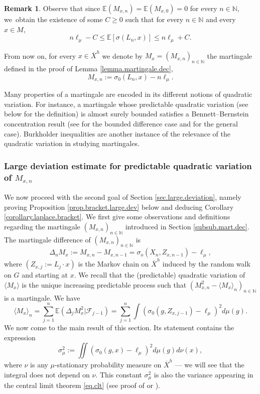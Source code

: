 \documentclass[JEP,XML,SOM,Unicode,published]{cedram}
\theoremstyle{plain}
\theoremstyle{definition}
\newtheorem{remark}[theorem]{Remark}
\newcommand\E{\mathbb{E}}
\newcommand\N{\mathbb{N}}
\begin{document}
\begin{remark}\label{remark.martingale}
Observe that since $\E(M_{x,n})=\E(M_{x,0})=0$ for every $n\in \N$, we~obtain the existence of some $C\geq 0$ such that for every $n\in \N$ and every $x\in M$,
\[
n\ell_\mu - C \leq \E[\sigma(L_n, x)] \leq n \ell_\mu+C.
\]
\end{remark}

From now on, for every $x\in \overline{X}^h$ we denote by $M_x=(M_{x,n})_{n\in \N}$ the martingale defined in the proof of Lemma \ref{lemma.martingale.dec}, \ie
\[
M_{x,n}:=\sigma_0(L_n, x)-n\ell_{\mu}.
\]

Many properties of a martingale are encoded in its different notions of quadratic variation. For instance, a martingale whose predictable quadratic variation (see below for the definition) is almost surely bounded satisfies a Bennett--Bernstein concentration result (see \cite{Freedman} for the bounded difference case and \cite{pena,DZ,fan.grama.liu} for the general case). Burkholder inequalities \cite{burkholder} are another instance of the relevance of the quadratic variation in studying martingales.

\subsubsection{Large deviation estimate for predictable quadratic variation of $M_{x,n}$} \label{subsub.bracket.large.dev}
We now proceed with the second goal of Section \ref{sec.large.deviation}, namely proving Proposition \ref{prop.bracket.large.dev} below and deducing Corollary \ref{corollary.laplace.bracket}. We first give some observations and definitions regarding the martingale $(M_{x,n})_{n\in \N}$ introduced in Section \ref{subsub.mart.dec}. The martingale difference of $(M_{x,n})_{n\in \N}$ is
\begin{equation}\label{our.martingale.difference}\Delta_n M_x:=M_{x,n}-M_{x,n-1}=\sigma_o(X_n, Z_{x,n-1})-\ell_\mu,\end{equation}
where $(Z_{x,j}:=L_j\cdot x)$ is the Markov chain on $\overline{X}^h$ induced by the random walk on $G$ and starting at $x$.
We recall that the (predictable) quadratic variation of $\langle M_x\rangle$ is the unique increasing predictable process such that $(M_{x,n}^2-\langle M_x \rangle_n)_{n\in \N}$ is a martingale. We have
\begin{equation}\label{bracket.expression}\langle M_x\rangle_n=
\sum_{j=1}^n{\E(\Delta_j M_{x}^2 | \mathcal{F}_{j-1})}=
\sum_{j=1}^n{\int{(\sigma_0(g,Z_{x,j-1}) -\ell_{\mu})^2 d\mu(g)}}.\end{equation}
We now come to the main result of this section. Its statement contains the expression
\begin{equation}\label{eq.exp.variance}
\sigma_{\mu}^2:=\iint{(\sigma_0(g,x)-\ell_{\mu})^2 d\mu(g) d\nu(x)},
\end{equation}
where $\nu$ is any $\mu$-stationary probability measure on $\overline{X}^h$ --- we will see that the integral does not depend on $\nu$. This constant $\sigma_\mu^2$ is also the variance appearing in the central limit theorem \eqref{eq.clt} (see proof of \cite[Th.\,4.7.b]{BQ.hyperbolic} or \cite[Th.\,1.3]{horbez}).
\end{document}
